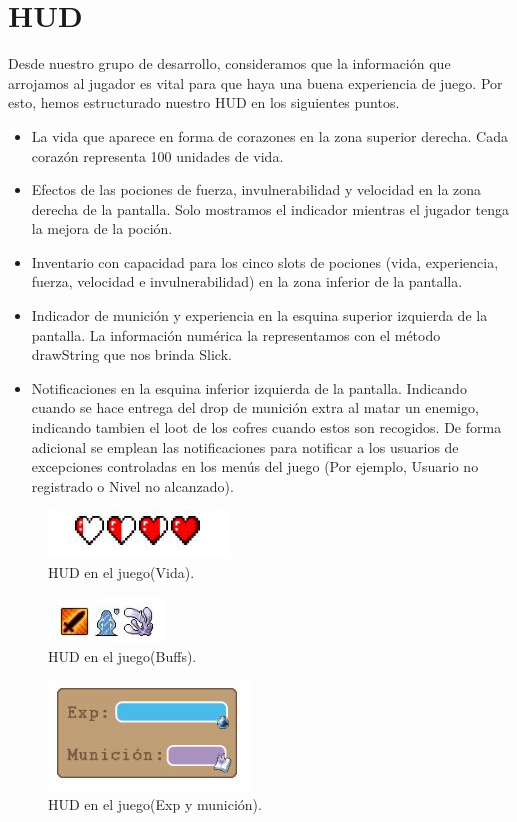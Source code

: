 \section{HUD}
Desde nuestro grupo de desarrollo, consideramos que la información que arrojamos al jugador es vital para que haya una buena experiencia de juego. Por esto, hemos estructurado nuestro HUD en los siguientes puntos.
\begin{itemize}
    \item  La vida que aparece en forma de corazones en la zona superior derecha. Cada corazón representa 100 unidades de vida.
     \item Efectos de las pociones de fuerza, invulnerabilidad y velocidad en la zona derecha de la pantalla. Solo mostramos el indicador mientras el jugador tenga la mejora de la poción.
      \item Inventario con capacidad para los cinco slots de pociones (vida, experiencia, fuerza, velocidad e invulnerabilidad) en la zona inferior de la pantalla.
       \item Indicador de munición y experiencia en la esquina superior izquierda de la pantalla. La información numérica la representamos con el método drawString que nos brinda Slick.
        \item Notificaciones en la esquina inferior izquierda de la pantalla. Indicando cuando se hace entrega del drop de munición extra al matar un enemigo, indicando tambien el loot de los cofres cuando estos son recogidos. De forma adicional se emplean las notificaciones para notificar a los usuarios de excepciones controladas en los menús del juego (Por ejemplo, Usuario no registrado o Nivel no alcanzado).
\end{itemize}
\newpage
\begin{figure}[!htb]
  \centering
    \includegraphics{./img/5.JPG}
    \caption{HUD en el juego(Vida).}
  \label{fig:yo}
\end{figure}
\begin{figure}[!htb]
  \centering
    \includegraphics{./img/6.JPG}
    \caption{HUD en el juego(Buffs).}
  \label{fig:yo}
\end{figure}
\begin{figure}[!htb]
  \centering
    \includegraphics{./img/7.JPG}
    \caption{HUD en el juego(Exp y munición).}
  \label{fig:yo}
\end{figure}
